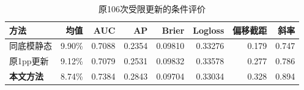 \begin{table}[H]\centering\caption{原106次受限更新的条件评价}
\fontsize{9bp}{12bp}\selectfont
\begin{tabularx}{\linewidth}{@{}Yrrrrrrr@{}}\toprule
方法 & 均值 & AUC & AP & Brier & Logloss & 偏移截距 & 斜率\\\midrule
同底模静态 & 9.90\% & 0.7088 & 0.2354 & 0.09810 & 0.33276 & 0.179 & 0.747\\
原1pp更新 & 9.12\% & 0.7079 & 0.2531 & 0.09832 & 0.33578 & 0.277 & 0.786\\
\textbf{本文方法} & 8.74\% & 0.7384 & 0.2843 & 0.09704 & 0.33034 & 0.328 & 0.894\\
\bottomrule\end{tabularx}
\end{table}